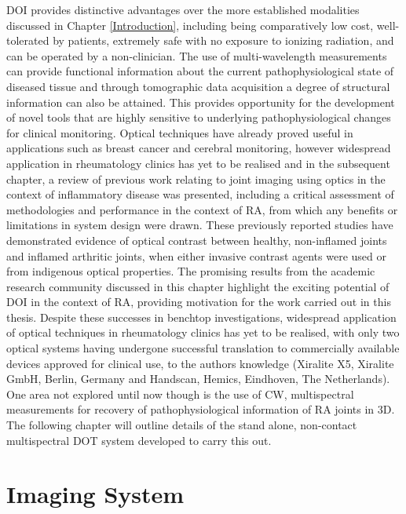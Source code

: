 \documentclass[twoside]{bhamthesis}
\theoremstyle{definition}
\begin{document}
DOI provides distinctive advantages over the more established modalities discussed in Chapter \ref{Introduction}, including being comparatively low cost, well-tolerated by patients, extremely safe with no exposure to ionizing radiation, and can be operated by a non-clinician. The use of multi-wavelength measurements can provide functional information about the current pathophysiological state of diseased tissue and through tomographic data acquisition a degree of structural information can also be attained. This provides opportunity for the development of novel tools that are highly sensitive to underlying pathophysiological changes for clinical monitoring. Optical techniques have already proved useful in applications such as breast cancer and cerebral monitoring, however widespread application in rheumatology clinics has yet to be realised and in the subsequent chapter, a review of previous work relating to joint imaging using optics in the context of inflammatory disease was presented, including a critical assessment of methodologies and performance in the context of RA, from which any benefits or limitations in system design were drawn. These previously reported studies have demonstrated evidence of optical contrast between healthy, non-inflamed joints and inflamed arthritic joints, when either invasive contrast agents were used or from indigenous optical properties. The promising results from the academic research community discussed in this chapter highlight the exciting potential of DOI in the context of RA, providing motivation for the work carried out in this thesis. Despite these successes in benchtop investigations, widespread application of optical techniques in rheumatology clinics has yet to be realised, with only two optical systems having undergone successful translation to commercially available devices approved for clinical use, to the authors knowledge (Xiralite X5, Xiralite GmbH, Berlin, Germany and Handscan, Hemics, Eindhoven, The Netherlands). One area not explored until now though is the use of CW, multispectral measurements for recovery of pathophysiological information of RA joints in 3D. The following chapter will outline details of the stand alone, non-contact multispectral DOT system developed to carry this out.

\chapter{Imaging System}

\label{Imaging System}
\end{document}
